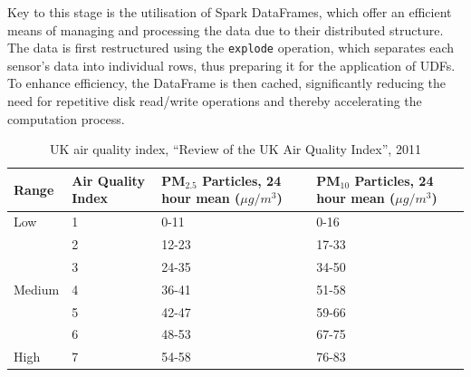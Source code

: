 \documentclass[12pt,oneside]{book} %
\begin{document}
Key to this stage is the utilisation of Spark DataFrames, which offer an
efficient means of managing and processing the data due to their distributed
structure. The data is first restructured using the \texttt{explode} operation,
which separates each sensor's data into individual rows, thus preparing it for
the application of UDFs. To enhance efficiency, the DataFrame is then cached,
significantly reducing the need for repetitive disk read/write operations and
thereby accelerating the computation process.

\begin{table}[H]
    \centering
    \caption{UK air quality index, ``Review of the UK Air Quality Index'', 2011}
    \begin{tabular}{|p{2cm}|p{2cm}|p{}|p{}|}
        \hline
        \textbf{Range} & \textbf{Air Quality Index} & \textbf{PM\(_{2.5}\) Particles, 24 hour mean (\(\mu g/m^3\))} & \textbf{PM\(_{10}\) Particles, 24 hour mean (\(\mu g/m^3\))} \\ \hline
        Low            & 1                          & 0-11                                                          & 0-16                                                         \\
                       & 2                          & 12-23                                                         & 17-33                                                        \\
                       & 3                          & 24-35                                                         & 34-50                                                        \\ \hline
        Medium         & 4                          & 36-41                                                         & 51-58                                                        \\
                       & 5                          & 42-47                                                         & 59-66                                                        \\
                       & 6                          & 48-53                                                         & 67-75                                                        \\ \hline
        High           & 7                          & 54-58                                                         & 76-83                                                        \\

\end{tabular}
\end{table}
\end{document}
